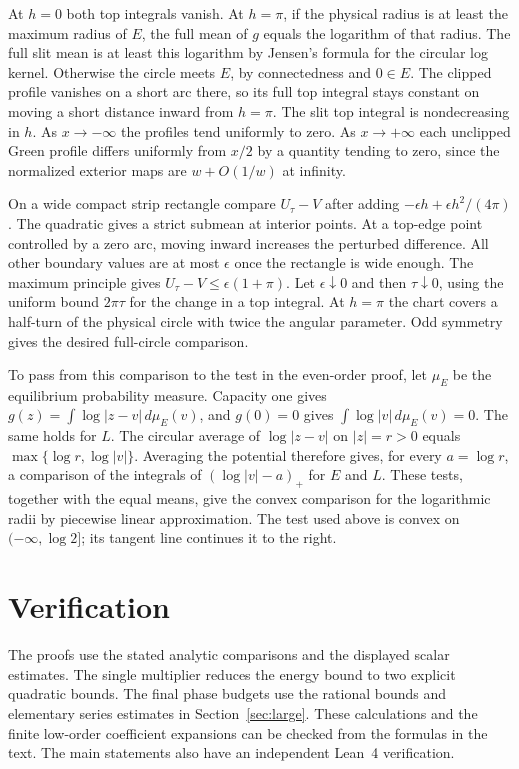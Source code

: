 \documentclass[11pt]{article}
\begin{document}
	At $h=0$ both top integrals vanish. At $h=\pi$, if the physical
	radius is at least the maximum radius of $E$, the full mean of $g$
	equals the logarithm of that radius. The full slit mean is at least
	this logarithm by Jensen's formula for the circular log kernel.
	Otherwise the circle meets $E$, by connectedness and $0\in E$.
	The clipped profile vanishes on a short arc there, so its full top
	integral stays constant on moving a short distance inward from
	$h=\pi$. The slit top integral is nondecreasing in $h$.
	As $x\to-\infty$ the profiles tend uniformly to zero. As
	$x\to+\infty$ each unclipped Green profile differs uniformly from
	$x/2$ by a quantity tending to zero, since the normalized exterior
	maps are $w+O(1/w)$ at infinity.
	
	On a wide compact strip rectangle compare $U_\tau-V$ after adding
	$-\epsilon h+\epsilon h^2/(4\pi)$. The quadratic gives a strict
	submean at interior points. At a top-edge point controlled by a
	zero arc, moving inward increases the perturbed difference. All
	other boundary values are at most $\epsilon$ once the rectangle
	is wide enough. The maximum principle gives
	$U_\tau-V\le\epsilon(1+\pi)$. Let $\epsilon\downarrow0$ and then
	$\tau\downarrow0$, using the uniform bound $2\pi\tau$ for the change
	in a top integral. At $h=\pi$ the chart covers a half-turn of the
	physical circle with twice the angular parameter. Odd symmetry gives
	the desired full-circle comparison.
	
	To pass from this comparison to the test in the even-order proof,
	let $\mu_E$ be the equilibrium probability measure. Capacity one gives
	$g(z)=\int\log|z-v|\,d\mu_E(v)$, and $g(0)=0$ gives
	$\int\log|v|\,d\mu_E(v)=0$. The same holds for $L$. The circular
	average of $\log|z-v|$ on $|z|=r>0$ equals
	$\max\{\log r,\log|v|\}$. Averaging the potential therefore gives,
	for every $a=\log r$, a comparison of the integrals of
	$(\log|v|-a)_+$ for $E$ and $L$. These tests, together with the
	equal means, give the convex comparison for the logarithmic radii
	by piecewise linear approximation. The test used above is convex
	on $(-\infty,\log 2]$; its tangent line continues it to the right.
	\section*{Verification}
	The proofs use the stated analytic comparisons and the displayed
	scalar estimates. The single multiplier reduces the energy bound
	to two explicit quadratic bounds. The final phase budgets use
	the rational bounds and elementary series estimates in
	Section~\ref{sec:large}. These calculations and the finite
	low-order coefficient expansions can be checked from the
	formulas in the text. The main statements also have an independent
	Lean~4 verification.
	
\end{document}
